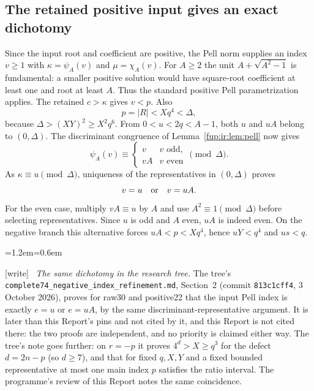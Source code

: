 \documentclass[11pt,letterpaper]{article}
\theoremstyle{definition}\newtheorem{definition}[theorem]{Definition}
\theoremstyle{remark}\newtheorem{remark}[theorem]{Remark}
\newcommand{\wtag}{\textup{[write]}}
\newenvironment{writenote}{\par\smallskip\begin{list}{}{\leftmargin=1.2em\rightmargin=0.6em}\item[]\small\wtag\ }{\end{list}\smallskip}
\newcommand{\rw}[1]{\nolinkurl{#1}}%
\begin{document}
\subsection{The retained positive input gives an exact dichotomy}
Since the input root and coefficient are positive, the Pell norm supplies an index $v\ge1$ with $\kappa=\psi_A(v)$ and $\mu=\chi_A(v)$. For $A\ge2$ the unit $A+\sqrt{A^2-1}$ is fundamental: a smaller positive solution would have square-root coefficient at least one and root at least $A$. Thus the standard positive Pell parametrization applies. The retained $c>\kappa$ gives $v<p$. Also
\[
 p=|R|<Xq^4<\Delta,
\]
because $\Delta>(XY)^2\ge X^2q^6$. From $0<u<2q<A-1$, both $u$ and $uA$ belong to $(0,\Delta)$. The discriminant congruence of Lemma~\ref{fup:ir:lem:pell} now gives
\[
 \psi_A(v)\equiv
 \begin{cases}v&v\text{ odd},\\vA&v\text{ even}\end{cases}\pmod\Delta.
\]
As $\kappa\equiv u\pmod\Delta$, uniqueness of the representatives in $(0,\Delta)$ proves
\begin{equation}\label{fup:ir:eq:inputdichotomy}
 v=u\quad\hbox{or}\quad v=uA.
\end{equation}
For the even case, multiply $vA\equiv u$ by $A$ and use $A^2\equiv1\pmod\Delta$ before selecting representatives. Since $u$ is odd and $A$ even, $uA$ is indeed even. On the negative branch this alternative forces $uA<p<Xq^4$, hence $uY<q^4$ and $us<q$.
\begin{writenote}
\emph{The same dichotomy in the research tree.} The tree's \rw{complete74_negative_index_refinement.md}, Section~2 (commit \texttt{813c1cff4}, 3 October 2026), proves for raw30 and positive22 that the input Pell index is exactly $e=u$ or $e=uA$, by the same discriminant-representative argument. It is later than this Report's pins and not cited by it, and this Report is not cited there: the two proofs are independent, and no priority is claimed either way. The tree's note goes further: on $r=-p$ it proves $4^d>X\ge q^3$ for the defect $d=2n-p$ (so $d\ge7$), and that for fixed $q,X,Y$ and a fixed bounded representative at most one main index $p$ satisfies the ratio interval. The programme's review of this Report notes the same coincidence.
\end{writenote}
\end{document}
